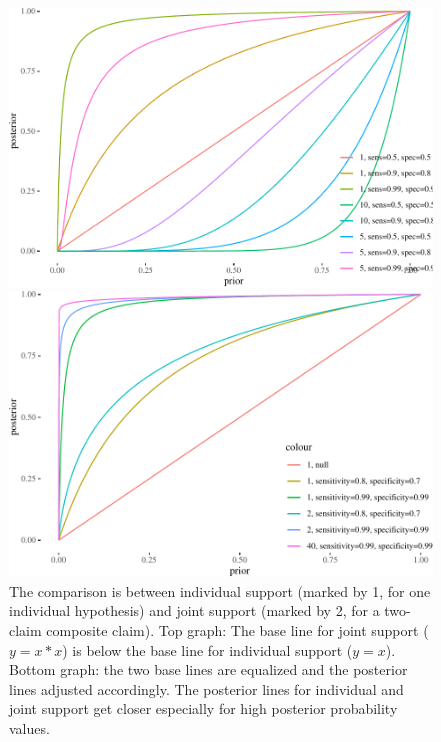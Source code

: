 \documentclass[
  10pt,
  dvipsnames,enabledeprecatedfontcommands]{scrartcl}
\begin{document}
\begin{figure}


\begin{center}\includegraphics[width=0.9\linewidth]{conjunction-paradox_files/figure-latex/unnamed-chunk-9-1} \end{center}




\begin{center}\includegraphics[width=0.9\linewidth]{conjunction-paradox_files/figure-latex/unnamed-chunk-10-1} \end{center}

\caption{The comparison is between individual support (marked by 1, for one individual 
hypothesis) and joint support (marked by 2, for a two-claim composite claim). 
Top graph: The base line for joint support ($y=x*x$) is 
below the base line for individual support ($y=x$).
Bottom graph: the two base lines are equalized and the 
posterior lines adjusted accordingly. The posterior 
lines for individual and joint support 
get closer especially for high posterior probability values.}
\label{fig:post-indiv-joint}
\end{figure}
\end{document}
